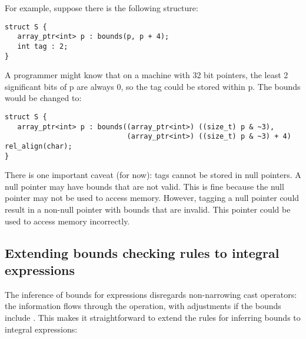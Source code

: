 For example, suppose there is the following structure:

\begin{verbatim}
struct S {
   array_ptr<int> p : bounds(p, p + 4);
   int tag : 2;
}
\end{verbatim}

A programmer might know that on a machine with 32 bit pointers, the
least 2 significant bits of p are always 0, so the tag could be stored
within p. The bounds would be changed to:

\begin{verbatim}
struct S {
   array_ptr<int> p : bounds((array_ptr<int>) ((size_t) p & ~3), 
                             (array_ptr<int>) ((size_t) p & ~3) + 4) rel_align(char);
}
\end{verbatim}

There is one important caveat (for now): tags cannot be stored in null pointers. A
null pointer may have bounds that are not valid. This is fine because
the null pointer may not be used to access memory. However, tagging a
null pointer could result in a non-null pointer with bounds that are
invalid. This pointer could be used to access memory incorrectly.

\subsection{Extending bounds checking rules to integral
expressions}

The inference of bounds for expressions disregards non-narrowing cast operators:
the  information flows through the operation, with adjustments if the bounds
include \exprcurrentvalue.  This makes it straightforward to extend the
rules for inferring bounds to integral expressions:

